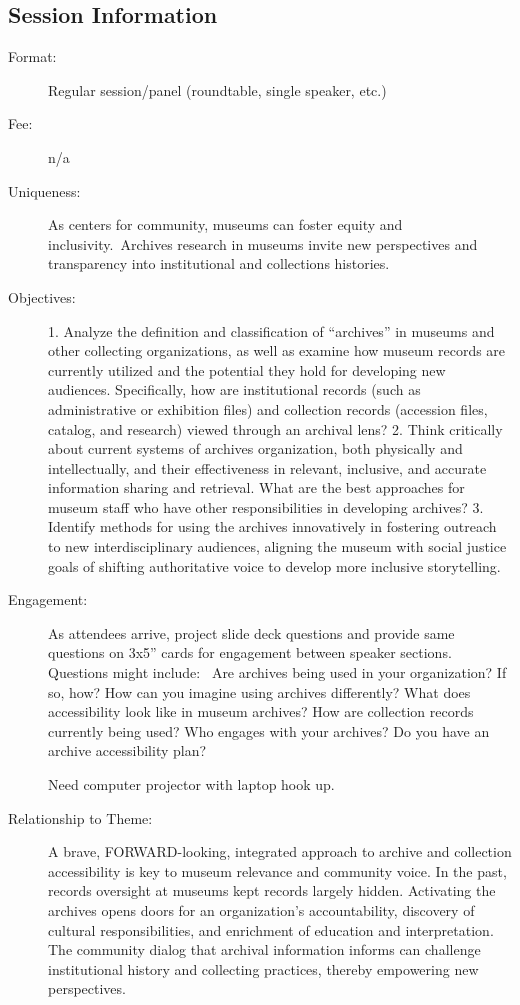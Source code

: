 \documentclass{report}
\begin{document}
              \subsection*{Session Information}
                \begin{description}
                  \item [Format:] Regular session/panel (roundtable, single speaker, etc.)
							    
								  \item [Fee:]n/a
							     
							    \item [Uniqueness:]As centers for community, museums can foster equity and inclusivity. Archives research in museums invite new perspectives and transparency into institutional and collections histories.
							    \item [Objectives:]1. Analyze the definition and classification of “archives” in museums and other collecting organizations, as well as examine how museum records are currently utilized and the potential they hold for developing new audiences. Specifically, how are institutional records (such as administrative or exhibition files) and collection records (accession files, catalog, and research) viewed through an archival lens?
2. Think critically about current systems of archives organization, both physically and intellectually, and their effectiveness in relevant, inclusive, and accurate information sharing and retrieval. What are the best approaches for museum staff who have other responsibilities in developing archives?
3. Identify methods for using the archives innovatively in fostering outreach to new interdisciplinary audiences, aligning the museum with social justice goals of shifting authoritative voice to develop more inclusive storytelling.
							    \item [Engagement:]As attendees arrive, project slide deck questions and provide same questions on 3x5” cards for engagement between speaker sections.
Questions might include: 
Are archives being used in your organization? If so, how?
How can you imagine using archives differently?
What does accessibility look like in museum archives?
How are collection records currently being used?
Who engages with your archives?
Do you have an archive accessibility plan?

Need computer projector with laptop hook up.
							    \item [Relationship to Theme:]A brave, FORWARD-looking, integrated approach to archive and collection accessibility is key to museum relevance and community voice. In the past, records oversight at museums kept records largely hidden. Activating the archives opens doors for an organization’s accountability, discovery of cultural responsibilities, and enrichment of education and interpretation. The community dialog that archival information informs can challenge institutional history and collecting practices, thereby empowering new perspectives.
							    

\end{description}
\end{document}
